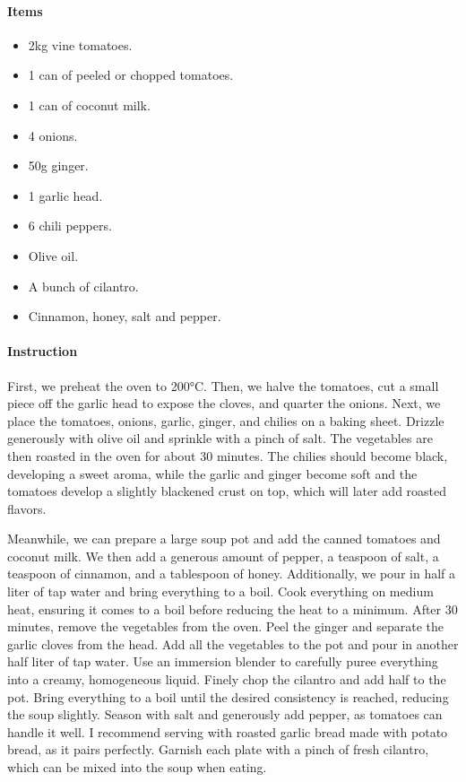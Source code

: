 \paragraph{Items}
\begin{itemize}[noitemsep]
	\item[\ding{182}] 2kg vine tomatoes.
	\item[\ding{183}] 1 can of peeled or chopped tomatoes.
	\item[\ding{184}] 1 can of coconut milk.
	\item[\ding{185}] 4 onions.
	\item[\ding{186}] 50g ginger.
	\item[\ding{187}] 1 garlic head.
	\item[\ding{188}] 6 chili peppers.
	\item[\ding{189}] Olive oil.
	\item[\ding{190}] A bunch of cilantro.
	\item[\ding{191}] Cinnamon, honey, salt and pepper.
\end{itemize}

\paragraph{Instruction} First, we preheat the oven to 200°C. Then, we halve the tomatoes, cut a small piece off the garlic head to expose the cloves, and quarter the onions. Next, we place the tomatoes, onions, garlic, ginger, and chilies on a baking sheet. Drizzle generously with olive oil and sprinkle with a pinch of salt. The vegetables are then roasted in the oven for about 30 minutes. The chilies should become black, developing a sweet aroma, while the garlic and ginger become soft and the tomatoes develop a slightly blackened crust on top, which will later add roasted flavors.

Meanwhile, we can prepare a large soup pot and add the canned tomatoes and coconut milk. We then add a generous amount of pepper, a teaspoon of salt, a teaspoon of cinnamon, and a tablespoon of honey. Additionally, we pour in half a liter of tap water and bring everything to a boil. Cook everything on medium heat, ensuring it comes to a boil before reducing the heat to a minimum. After 30 minutes, remove the vegetables from the oven. Peel the ginger and separate the garlic cloves from the head. Add all the vegetables to the pot and pour in another half liter of tap water. Use an immersion blender to carefully puree everything into a creamy, homogeneous liquid. Finely chop the cilantro and add half to the pot. Bring everything to a boil until the desired consistency is reached, reducing the soup slightly. Season with salt and generously add pepper, as tomatoes can handle it well. I recommend serving with roasted garlic bread made with potato bread, as it pairs perfectly. Garnish each plate with a pinch of fresh cilantro, which can be mixed into the soup when eating.